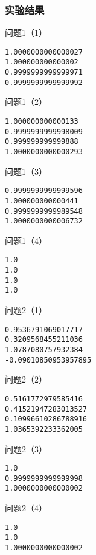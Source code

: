 \documentclass[a4paper,zihao=4,UTF8]{ctexart}
\begin{document}
\subsubsection*{实验结果}

问题1（1）

\begin{lstlisting}
1.0000000000000027
1.000000000000002
0.9999999999999971
0.9999999999999992
\end{lstlisting}

问题1（2）

\begin{lstlisting}
1.000000000000133
0.9999999999998009
0.999999999999888
1.0000000000000293
\end{lstlisting}

问题1（3）

\begin{lstlisting}
0.9999999999999596
1.000000000000441
0.9999999999989548
1.0000000000006732
\end{lstlisting}

问题1（4）

\begin{lstlisting}
1.0
1.0
1.0
1.0
\end{lstlisting}

问题2（1）

\begin{lstlisting}
0.9536791069017717
0.3209568455211036
1.0787080757932384
-0.09010850953957895
\end{lstlisting}

问题2（2）

\begin{lstlisting}
0.5161772979585416
0.41521947283013527
0.10996610286788916
1.0365392233362005
\end{lstlisting}

问题2（3）

\begin{lstlisting}
1.0
0.9999999999999998
1.0000000000000002
\end{lstlisting}

问题2（4）

\begin{lstlisting}
1.0
1.0
1.0000000000000002
\end{lstlisting}


\end{document}
